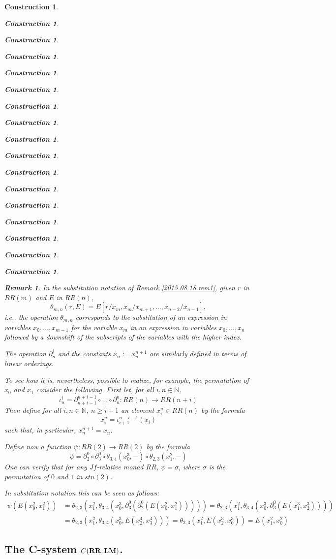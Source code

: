\documentclass[onecolumn,12pt]{amsart}
\newtheorem{remark}[proposition]{Remark}
\numberwithin{proposition}{subsection}
\newtheorem{construction}[proposition]{Construction}
\newcommand{\sr}{\rightarrow}
\newcommand{\nn}{{\mathbb N}}
\newcommand{\nat}{\nn}
\newcommand{\RR}{{\bf RR}}
\newcommand{\LM}{{\bf LM}}
\begin{document}
\begin{construction}
\begin{construction}
\begin{construction}
\begin{construction}
\begin{construction}
\begin{construction}
\begin{construction}
\begin{construction}
\begin{construction}
\begin{construction}
\begin{construction}
\begin{construction}
\begin{construction}
\begin{construction}
\begin{construction}
\begin{construction}
\begin{construction}
\begin{remark}
In the substitution notation of Remark \ref{2015.08.18.rem1}, given $r$ in
$RR(m)$ and $E$ in $RR(n)$,
%
$$\theta_{m,n}(r,E)=E[r/x_m,x_m/x_{m+1},\dots,x_{n-2}/x_{n-1}],$$
%
i.e., the operation $\theta_{m,n}$ corresponds to the substitution of an
expression in variables $x_0,\dots,x_{m-1}$ for the variable $x_m$ in an
expression in variables $x_0,\dots,x_n$ followed by a downshift of the subscripts
of the variables with the higher index.

The operation $\partial_n^i$ and the constants $x_n:=x^{n+1}_{n}$ are similarly
defined in terms of linear orderings.

To see how it is, nevertheless, possible to realize, for example, the
permutation of $x_0$ and $x_1$ consider the following. First let, for all
$i,n\in\nat$,
%
$$\iota_n^i=\partial_{n+i-1}^{n+i-1}\circ \dots\circ \partial_n^n:RR(n)\sr RR(n+i)$$
%
Then define for all $i,n\in\nat$, $n\ge i+1$ an element $x^n_i\in RR(n)$ by the formula
%
$$x^n_i=\iota_{i+1}^{n-i-1}(x_i)$$
%
such that, in particular, $x^{n+1}_{n}=x_n$.

Define now a function $\psi:RR(2)\sr RR(2)$ by the formula
%
$$\psi=\partial^0_2\circ \partial^0_3\circ \theta_{3,4}(x_0^3,-)\circ \theta_{2,3}(x_1^2,-)$$
%
One can verify that for any $Jf$-relative monad $RR$, $\psi=\sigma$, where
$\sigma$ is the permutation of $0$ and $1$ in $stn(2)$.

In substitution notation this can be seen as follows:
\begin{equation*}
  \begin{split}
    \psi(E(x^2_0,x_1^2))&=\theta_{2,3}(x_1^2,\theta_{3,4}(x_0^3,\partial^0_3(\partial^0_2(E(x^2_0,x_1^2)))))=\theta_{2,3}(x_1^2,\theta_{3,4}(x_0^3,\partial^0_3(E(x^3_1,x^3_2))))
    \\&=\theta_{2,3}(x_1^2,\theta_{3,4}(x_0^3,E(x^4_2,x^4_3)))=\theta_{2,3}(x_1^2,E(x^3_2,x^3_0))=E(x^2_1,x^2_0)
  \end{split}
\end{equation*}
\end{remark}
%

\subsection{The C-system $C(\RR,\LM)$.}
%
\label{CRRLM}


\end{construction}
\end{construction}
\end{construction}
\end{construction}
\end{construction}
\end{construction}
\end{construction}
\end{construction}
\end{construction}
\end{construction}
\end{construction}
\end{construction}
\end{construction}
\end{construction}
\end{construction}
\end{construction}
\end{construction}
\end{document}
